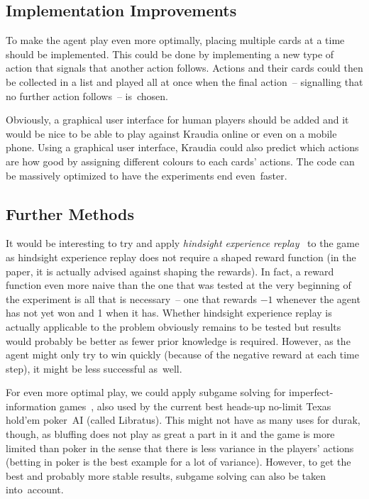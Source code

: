 \documentclass[a4paper,titlepage]{article}
\begin{document}
\subsection{Implementation Improvements}
\label{sec:improvements}

To make the agent play even more optimally, placing multiple cards at a time should be implemented. This could be done by implementing a new type of action that signals that another action follows. Actions and their cards could then be collected in a list and played all at once when the final action~-- signalling that no further action follows~-- is~chosen.

Obviously, a graphical user interface for human players should be added and it would be nice to be able to play against Kraudia online or even on a mobile phone. Using a graphical user interface, Kraudia could also predict which actions are how good by assigning different colours to each cards' actions. The code can be massively optimized to have the experiments end even~faster.

\subsection{Further Methods}

It would be interesting to try and apply \emph{hindsight experience replay}~\cite{her} to the game as hindsight experience replay does not require a shaped reward function (in the paper, it is actually advised against shaping the rewards). In fact, a reward function even more naive than the one that was tested at the very beginning of the experiment is all that is necessary~-- one that rewards $-1$ whenever the agent has not yet won and 1 when it has. Whether hindsight experience replay is actually applicable to the problem obviously remains to be tested but results would probably be better as fewer prior knowledge is required. However, as the agent might only try to win quickly (because of the negative reward at each time step), it might be less successful as~well.

For even more optimal play, we could apply subgame solving for imperfect-information games~\cite{subgame}, also used by the current best heads-up no-limit Texas hold'em poker~AI (called Libratus). This might not have as many uses for durak, though, as bluffing does not play as great a part in it and the game is more limited than poker in the sense that there is less variance in the players' actions (betting in poker is the best example for a lot of variance). However, to get the best and probably more stable results, subgame solving can also be taken into~account.
\end{document}
